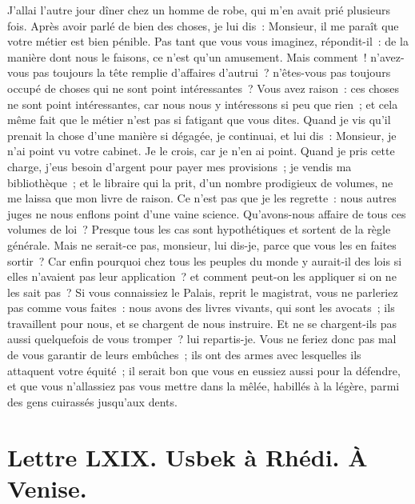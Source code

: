 \documentclass[french,twoside]{book} %
\newcommand{\dateline}[1]{\medskip{\RaggedLeft{#1}\par}\bigskip}
\begin{document}
\noindent J’allai l’autre jour dîner chez un homme de robe, qui m’en avait prié plusieurs fois. Après avoir parlé de bien des choses, je lui dis : Monsieur, il me paraît que votre métier est bien pénible. Pas tant que vous vous imaginez, répondit-il : de la manière dont nous le faisons, ce n’est qu’un amusement. Mais comment ! n’avez-vous pas toujours la tête remplie d’affaires d’autrui ? n’êtes-vous pas toujours occupé de choses qui ne sont point intéressantes ? Vous avez raison : ces choses ne sont point intéressantes, car nous nous y intéressons si peu que rien ; et cela même fait que le métier n’est pas si fatigant que vous dites. Quand je vis qu’il prenait la chose d’une manière si dégagée, je continuai, et lui dis : Monsieur, je n’ai point vu votre cabinet. Je le crois, car je n’en ai point. Quand je pris cette charge, j’eus besoin d’argent pour payer mes provisions ; je vendis ma bibliothèque ; et le libraire qui la prit, d’un nombre prodigieux de volumes, ne me laissa que mon livre de raison. Ce n’est pas que je les regrette : nous autres juges ne nous enflons point d’une vaine science. Qu’avons-nous affaire de tous ces volumes de loi ? Presque tous les cas sont hypothétiques et sortent de la règle générale. Mais ne serait-ce pas, monsieur, lui dis-je, parce que vous les en faites sortir ? Car enfin pourquoi chez tous les peuples du monde y aurait-il des lois si elles n’avaient pas leur application ? et comment peut-on les appliquer si on ne les sait pas ? Si vous connaissiez le Palais, reprit le magistrat, vous ne parleriez pas comme vous faites : nous avons des livres vivants, qui sont les avocats ; ils travaillent pour nous, et se chargent de nous instruire. Et ne se chargent-ils pas aussi quelquefois de vous tromper ? lui repartis-je. Vous ne feriez donc pas mal de vous garantir de leurs embûches ; ils ont des armes avec lesquelles ils attaquent votre équité ; il serait bon que vous en eussiez aussi pour la défendre, et que vous n’allassiez pas vous mettre dans la mêlée, habillés à la légère, parmi des gens cuirassés jusqu’aux dents.\par

\dateline{À Paris, le 13 de la lune de Chahban, 1714.}
\section[{Lettre LXIX. Usbek à Rhédi. À Venise.}]{Lettre LXIX. Usbek à Rhédi. À Venise.}\renewcommand{\leftmark}{Lettre LXIX. Usbek à Rhédi. À Venise.}
\end{document}
